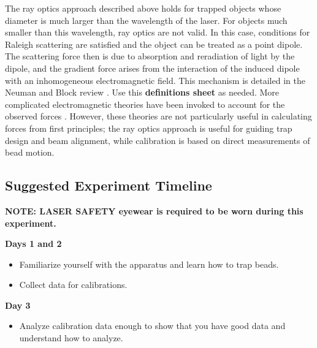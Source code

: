 \documentclass{../lab}
\begin{document}
The ray optics approach described above holds for trapped objects whose diameter is much larger than the wavelength of the laser. For objects much smaller than this wavelength, ray optics are not valid. In this case, conditions for Raleigh scattering are satisfied and the object can be treated as a point dipole. The scattering force then is due to absorption and reradiation of light by the dipole, and the gradient force arises from the interaction of the induced dipole with an inhomogeneous electromagnetic field. This mechanism is detailed in the Neuman and Block review \cite{Neuman}. Use this \textbf{definitions sheet} as needed. More complicated electromagnetic theories have been invoked to account for the observed forces \cite{Neuman,Bechhoefer,Shaevitz}. However, these theories are not particularly useful in calculating forces from first principles; the ray optics approach is useful for guiding trap design and beam alignment, while calibration is based on direct measurements of bead motion.

\subsection{Suggested Experiment Timeline}

\textbf{NOTE: LASER  SAFETY eyewear is required to be worn during this experiment.}

\textbf{Days 1 and 2}

\begin{itemize}
    \item Familiarize yourself with the apparatus and learn how to trap beads.
    \item Collect data for calibrations.

\end{itemize}

\textbf{Day 3}

\begin{itemize}
    \item Analyze calibration data enough to show that you have good data and understand how to analyze.

\end{itemize}
\end{document}
